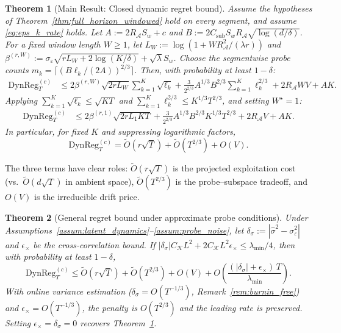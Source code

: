 \documentclass{article}
\newcommand{\cA}{\mathcal{A}}
\newcommand{\DynReg}{\mathrm{DynReg}}
\newtheorem{theorem}{Theorem}
\begin{document}
  \begin{theorem}[Main Result: Closed dynamic regret bound]
  \label{thm:closed_dynamic_regret}
  Assume the hypotheses of Theorem~\ref{thm:full_horizon_windowed} hold on every segment, and assume \eqref{eq:eps_k_rate} holds. Let
  $A := 2R_{\cA} S_w + c$ and $B := 2 C_{\mathrm{sub}} S_w R_{\cA} \sqrt{\log(d/\delta)}$.
  For a fixed window length $W\ge 1$, let $L_W := \log(1+WR_{\cA}^2/(\lambda r))$ and
  $\beta^{(r,W)} := \sigma_\varepsilon\sqrt{rL_W + 2\log(K/\delta)} + \sqrt{\lambda}S_w$.
  Choose the segmentwise probe counts
  $m_k = \lceil (B\ell_k/(2A))^{2/3} \rceil$.
  Then, with probability at least $1-\delta$:
  \begin{align}
  \DynReg_T^{(c)}
  &\le
  2\beta^{(r,W)} \sqrt{2rL_W} \sum_{k=1}^K \sqrt{\ell_k}
  + \frac{3}{2^{2/3}} A^{1/3} B^{2/3} \sum_{k=1}^K \ell_k^{2/3}
  + 2R_{\cA} W V + A K.
  \label{eq:closed_bound_segmentwise}
  \end{align}
  Applying $\sum_{k=1}^K \sqrt{\ell_k} \le \sqrt{KT}$ and $\sum_{k=1}^K \ell_k^{2/3} \le K^{1/3}T^{2/3}$, and setting $W^\star = 1$:
  \begin{align}
  \DynReg_T^{(c)}
  &\le
  2\beta^{(r,1)} \sqrt{2rL_1KT}
  + \frac{3}{2^{2/3}} A^{1/3} B^{2/3} K^{1/3} T^{2/3}
  + 2R_{\cA} V + A K.
  \label{eq:closed_bound_final}
  \end{align}
  In particular, for fixed $K$ and suppressing logarithmic factors,
  \begin{equation}
  \DynReg_T^{(c)} = \widetilde O\!\left(r\sqrt{T}\right) + \widetilde O\!\left(T^{2/3}\right) + O(V).
  \label{eq:closed_bound_simplified}
  \end{equation}
  \end{theorem}

  The three terms have clear roles: $\widetilde O(r\sqrt{T})$ is the projected exploitation cost (vs.\ $\widetilde O(d\sqrt{T})$ in
  ambient space), $\widetilde O(T^{2/3})$ is the probe--subspace tradeoff, and $O(V)$ is the irreducible drift price.

  \begin{theorem}[General regret bound under approximate probe conditions]
  \label{thm:closed_dynamic_regret_general}
  \label{cor:regret_misspecified_variance}
  Under Assumptions~\ref{assum:latent_dynamics}--\ref{assum:probe_noise}, let $\delta_\sigma := |\hat\sigma^2 -
  \sigma_\varepsilon^2|$ and $\epsilon_\times$ be the cross-correlation bound. If $|\delta_\sigma|C_{\mathcal K}L^2 + 2C_{\mathcal
  K}L^2\epsilon_\times \le \lambda_{\min}/4$, then with probability at least $1-\delta$,
  \begin{equation}
  \DynReg_T^{(c)} \le \widetilde O(r\sqrt{T}) + \widetilde O(T^{2/3}) + O(V) + O\!\left(\frac{(|\delta_\sigma| +
  \epsilon_\times)\,T}{\lambda_{\min}}\right).
  \label{eq:general_bound}
  \end{equation}
  With online variance estimation ($\delta_\sigma = O(T^{-1/3})$, Remark~\ref{rem:burnin_free}) and $\epsilon_\times = O(T^{-1/3})$,
  the penalty is $O(T^{2/3})$ and the leading rate is preserved. Setting $\epsilon_\times = \delta_\sigma = 0$ recovers
  Theorem~\ref{thm:closed_dynamic_regret}.
  \end{theorem}
\end{document}
